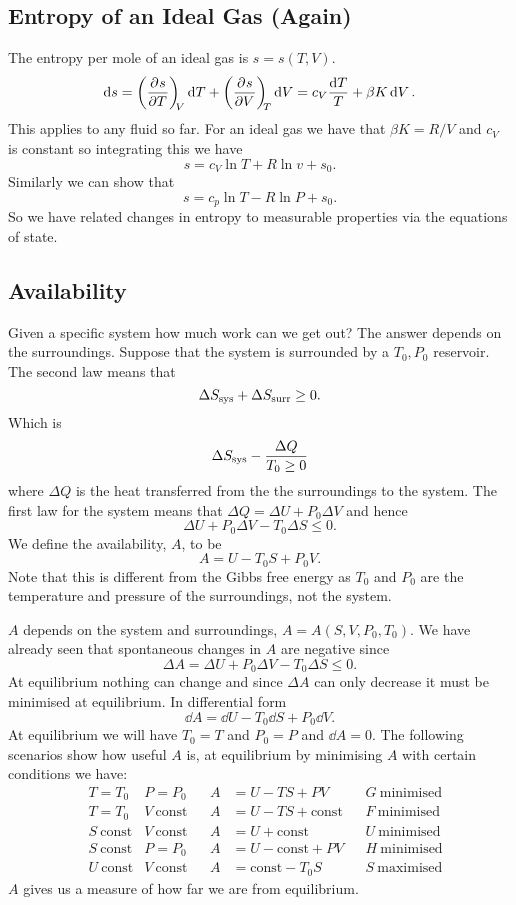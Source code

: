     \subsection{Entropy of an Ideal Gas (Again)}
    The entropy per mole of an ideal gas is \(s = s(T, V)\).
    \[\dd{s} = \left(\pdv[]{s}{T}\right)_{\!\!{V}}\dd{T} + \left(\pdv[]{s}{V}\right)_{\!\!{T}}\dd{V} = c_V\frac{\dd{T}}{T} + \beta K\dd{V}.\]
    This applies to any fluid so far.
    For an ideal gas we have that \(\beta K = R/V\) and \(c_V\) is constant so integrating this we have
    \[s = c_V\ln T + R\ln v + s_0.\]
    Similarly we can show that
    \[s = c_p\ln T - R\ln P + s_0.\]
    So we have related changes in entropy to measurable properties via the equations of state.
    
    \subsection{Availability}
    Given a specific system how much work can we get out?
    The answer depends on the surroundings.
    Suppose that the system is surrounded by a \(T_0, P_0\) reservoir.
    The second law means that
    \[\Delta S_{\mathrm{sys}}  + \Delta S_{\mathrm{surr}} \ge 0.\]
    Which is
    \[\Delta S_{\mathrm{sys}} - \frac{\Delta Q}{T_0 \ge 0}\]
    where \(\Delta Q\) is the heat transferred from the the surroundings to the system.
    The first law for the system means that \(\Delta Q = \Delta U + P_0\Delta V\) and hence
    \[\Delta U + P_0\Delta V - T_0\Delta S \le 0.\]
    We define the availability, \(A\), to be
    \[A = U - T_0S + P_0V.\]
    Note that this is different from the Gibbs free energy as \(T_0\) and \(P_0\) are the temperature and pressure of the surroundings, not the system.
    
    \(A\) depends on the system and surroundings, \(A = A(S, V, P_0, T_0)\).
    We have already seen that spontaneous changes in \(A\) are negative since
    \[\Delta A = \Delta U + P_0\Delta V - T_0\Delta S \le 0.\]
    At equilibrium nothing can change and since \(\Delta A\) can only decrease it must be minimised at equilibrium.
    In differential form
    \[\dd{A} = \dd{U} - T_0\dd{S} + P_0\dd{V}.\]
    At equilibrium we will have \(T_0 = T\) and \(P_0 = P\) and \(\dd{A} = 0\).
    The following scenarios show how useful \(A\) is, at equilibrium by minimising \(A\) with certain conditions we have:
    \begin{align*}
        &T = T_0 & P = P_0 && A &= U - TS + PV && G~\text{minimised}\\
        &T = T_0 & V~\text{const} && A &= U - TS + \text{const} && F~\text{minimised}\\
        &S~\text{const} & V~\text{const} && A &= U + \text{const} && U~\text{minimised}\\
        &S~\text{const} & P = P_0 && A &= U - \text{const} + PV && H~\text{minimised}\\
        &U~\text{const} & V~\text{const} && A &= \text{const} - T_0S && S~\text{maximised}
    \end{align*}
    \(A\) gives us a measure of how far we are from equilibrium.
    
